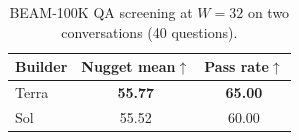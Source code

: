 \begin{table}[t]
\centering
\small
\caption{BEAM-100K QA screening at $W=32$ on two conversations (40 questions).}
\label{tab:w32-beam-screening}
\begin{tabular}{lcc}
\toprule
Builder & Nugget mean$\uparrow$ & Pass rate$\uparrow$ \\
\midrule
Terra & \textbf{55.77} & \textbf{65.00} \\
Sol   & 55.52 & 60.00 \\
\bottomrule
\end{tabular}
\end{table}
